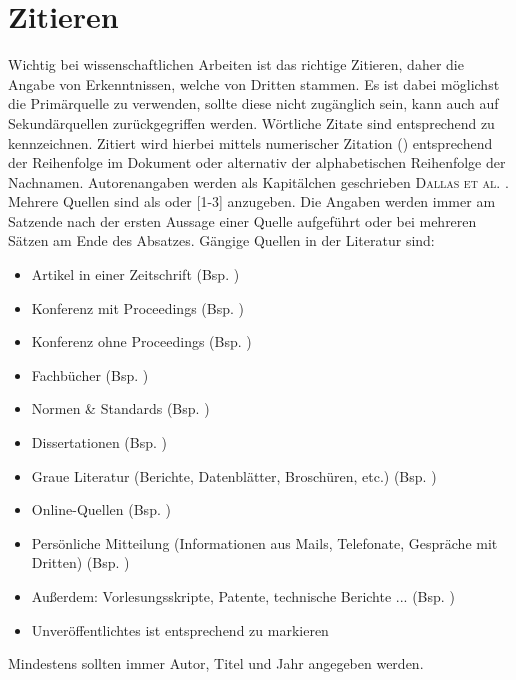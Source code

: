 \section{Zitieren}
\label{subsec:zitieren}
Wichtig bei wissenschaftlichen Arbeiten ist das richtige Zitieren, daher die Angabe von Erkenntnissen, welche von Dritten stammen. Es ist dabei möglichst die Primärquelle zu verwenden, sollte diese nicht zugänglich sein, kann auch auf Sekundärquellen zurückgegriffen werden. Wörtliche Zitate sind entsprechend zu kennzeichnen.
Zitiert wird hierbei mittels numerischer Zitation (\cite{Fasoulas2017}) entsprechend der Reihenfolge im Dokument oder alternativ der alphabetischen Reihenfolge der Nachnamen. Autorenangaben werden als Kapitälchen geschrieben \textsc{Dallas et al.} \cite{Dallas.2020}.
Mehrere Quellen sind als \cite{Fasoulas2017, Dallas.2020,Edwards.07072002} oder [1-3] anzugeben. Die Angaben werden immer am Satzende nach der ersten Aussage einer Quelle aufgeführt oder bei mehreren Sätzen am Ende des Absatzes. Gängige Quellen in der Literatur sind:
\begin{itemize}
	\item Artikel in einer Zeitschrift (Bsp. \cite{Dallas.2020})
	\item Konferenz mit Proceedings (Bsp. \cite{Edwards.07072002})
	\item Konferenz ohne Proceedings (Bsp. \cite{Chanoine.2017})
	\item Fachbücher (Bsp. \cite{Fasoulas2017})
	\item Normen \& Standards (Bsp. \cite{ECSS2009})
	\item Dissertationen (Bsp. \cite{AdelePoubeau.2015})
	\item Graue Literatur (Berichte, Datenblätter, Broschüren, etc.) (Bsp. \cite{Cicerone.051973,ESA2016})
	\item Online-Quellen (Bsp. \cite{EuropeanSpaceAgency2021})
	\item Persönliche Mitteilung (Informationen aus Mails, Telefonate, Gespräche mit Dritten) (Bsp. \cite{Fischer})
	\item Außerdem: Vorlesungsskripte, Patente, technische Berichte ... (Bsp. \cite{Cicerone.051973})
	\item Unveröffentlichtes ist entsprechend zu markieren
\end{itemize}
Mindestens sollten immer Autor, Titel und Jahr angegeben werden. 

